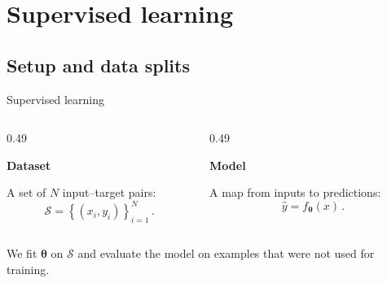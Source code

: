 \section{Supervised learning}
\subsection{Setup and data splits}

\begin{frame}{Supervised learning}

	\begin{columns}[T,onlytextwidth]
		\begin{column}{0.49\textwidth}
			\begin{tcolorbox}[nndsblue,courseheight={linear-setup}{0.42\textheight}]
				\textbf{\color{darkcerulean}Dataset}

				A set of $N$ input--target pairs:
				\begin{equation}
					\mathcal{S}=\left\{(x_i,y_i)\right\}_{i=1}^{N} \,.
				\end{equation}
			\end{tcolorbox}
		\end{column}
		\begin{column}{0.49\textwidth}
			\begin{tcolorbox}[nndsgreen,courseheight={linear-setup}{0.42\textheight}]
				\textbf{\color{darkgreen}Model}

				A map from inputs to predictions:
				\begin{equation}
					\hat{y}=f_{\boldsymbol{\theta}}(x) \,.
				\end{equation}
			\end{tcolorbox}
		\end{column}
	\end{columns}

	\vspace{1em}
	We fit $\boldsymbol{\theta}$ on $\mathcal{S}$ and evaluate the model on examples that were not used for training.

\end{frame}

